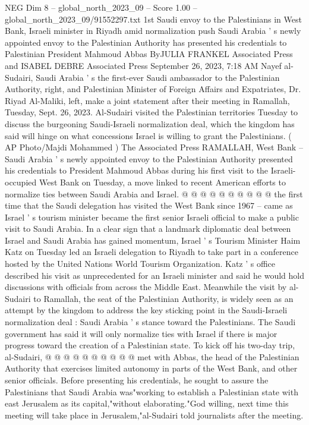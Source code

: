 \begin{textsample}{NEG Dim 8 – global\_north\_2023\_09 – Score 1.00 – global\_north\_2023\_09/91552297.txt}  \label{ex:f8_neg_152}
1st Saudi envoy to the Palestinians in West Bank, Israeli minister in Riyadh amid normalization push Saudi Arabia ' s newly appointed envoy to the Palestinian Authority has presented his credentials to Palestinian President Mahmoud Abbas ByJULIA FRANKEL Associated Press and ISABEL DEBRE Associated Press September 26, 2023, 7:18 AM Nayef al-Sudairi, Saudi Arabia ' s the first-ever Saudi ambassador to the Palestinian Authority, right, and Palestinian Minister of Foreign Affairs and Expatriates, Dr.
Riyad Al-Maliki, left, make a joint statement after their meeting in Ramallah, Tuesday, Sept. 26, 2023.
Al-Sudairi visited the Palestinian territories Tuesday to discuss the burgeoning Saudi-Israeli normalization deal, which the kingdom has said will hinge on what concessions Israel is willing to grant the Palestinians. ( AP Photo/Majdi Mohammed ) The Associated Press RAMALLAH, West Bank -- Saudi Arabia ' s newly appointed envoy to the Palestinian Authority presented his credentials to President Mahmoud Abbas during his first visit to the Israeli-occupied West Bank on Tuesday, a move linked to recent American efforts to normalize ties between Saudi Arabia and Israel. @ @ @ @ @ @ @ @ @ @ the first time that the Saudi delegation has visited the West Bank since 1967 -- came as Israel ' s tourism minister became the first senior Israeli official to make a public visit to Saudi Arabia.
In a clear sign that a landmark diplomatic deal between Israel and Saudi Arabia has gained momentum, Israel ' s Tourism Minister Haim Katz on Tuesday led an Israeli delegation to Riyadh to take part in a conference hosted by the United Nations World Tourism Organization.
Katz ' s office described his visit as unprecedented for an Israeli minister and said he would hold discussions with officials from across the Middle East.
Meanwhile the visit by al-Sudairi to Ramallah, the seat of the Palestinian Authority, is widely seen as an attempt by the kingdom to address the key sticking point in the Saudi-Israeli normalization deal : Saudi Arabia ' s stance toward the Palestinians.
The Saudi government has said it will only normalize ties with Israel if there is major progress toward the creation of a Palestinian state.
To kick off his two-day trip, al-Sudairi, @ @ @ @ @ @ @ @ @ @ met with Abbas, the head of the Palestinian Authority that exercises limited autonomy in parts of the West Bank, and other senior officials.
Before presenting his credentials, he sought to assure the Palestinians that Saudi Arabia was"working to establish a Palestinian state with east Jerusalem as its capital,"without elaborating."God willing, next time this meeting will take place in Jerusalem,"al-Sudairi told journalists after the meeting.

\end{textsample}
